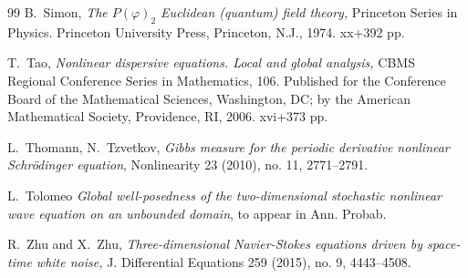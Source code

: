 \documentclass[%
11pt,  reqno]{amsart}
\newcommand{\1}{\hspace{0.2mm}\text{I}\hspace{0.2mm}}
\numberwithin{equation}{section}
\numberwithin{theorem}{section}
\begin{document}
\begin{thebibliography}{99}
B.~Simon, 
{\it  The $P(\varphi)_2$ Euclidean (quantum) field theory,} Princeton Series in Physics. Princeton University Press, Princeton, N.J., 1974. xx+392 pp.


T.~Tao, {\it Nonlinear dispersive equations. Local and global analysis,} CBMS Regional Conference Series in Mathematics, 106. Published for the Conference Board of the Mathematical Sciences, Washington, DC; by the American Mathematical Society, Providence, RI, 2006. xvi+373 pp.

L.~Thomann, N.~Tzvetkov, 
{\it Gibbs measure for the periodic derivative nonlinear Schr\"odinger equation},
 Nonlinearity 23 (2010), no. 11, 2771--2791.


L.~Tolomeo
{\it Global well-posedness of the two-dimensional stochastic nonlinear wave equation on an unbounded domain},
to appear in Ann. Probab. 




R.~Zhu and X.~Zhu,
{\it Three-dimensional {Navier}-{Stokes} equations driven by space-time
  white noise,}
 J. Differential Equations 259 (2015), no. 9, 4443--4508.


\end{thebibliography}
\end{document}
